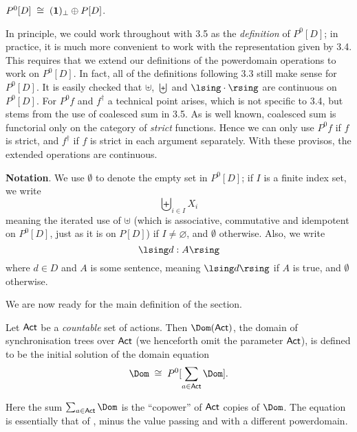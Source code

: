 \begin{observation}
$P^{0}[D] \; \cong \; ({\bf 1})_{\bot} \oplus P[D]$.
\end{observation}

In principle, we could work throughout with 3.5 as the {\em definition} of
$P^{0}[D]$; in practice, it is much more convenient to work with the
representation given by 3.4.
This requires that we extend our definitions of the powerdomain
operations to work on $P^{0}[D]$.
In fact, all of the definitions following 3.3 still make sense for $P^{0}[D]$.
It is easily checked that $\uplus$, $\biguplus$ and $\lsing \cdot \rsing$
are continuous on $P^{0}[D]$.
For $P^{0} f$ and $f^{\dagger}$ a technical point arises, which is not
specific to 3.4, but stems from the use of coalesced sum in 3.5.
As is well known,  coalesced sum is functorial only on the category of
{\em strict} functions.
Hence we can only use $P^{0} f$ if $f$ is strict, and $f^{\dagger}$ if $f$ is
strict in each argument separately.
With these provisos, the extended operations are continuous.

{\bf Notation}. We use $\emptyset$ to denote the empty set in $P^{0}[D]$;
if $I$ is a finite index set, we write
\[ \biguplus_{i \in I} X_{i} \]
meaning the iterated use of $\uplus$ (which is associative, commutative
and idempotent on $P^{0}[D]$, just as it is on $P[D]$) if $I \not=
\varnothing$, and $\emptyset$ otherwise.
Also, we write
\[ \lsing d : A \rsing \]
where $d \in D$ and $A$ is some sentence, meaning $\lsing d \rsing$ if
$A$ is true, and $\emptyset$ otherwise.

We are now ready for the main definition of the section.
\begin{definition}
{\rm Let ${\sf Act}$ be a {\em countable} set of actions.
Then $\Dom ({\sf Act})$, the domain of synchronisation trees over ${\sf Act}$ (we
henceforth omit the parameter ${\sf Act}$), is defined to be the initial solution
of the domain equation}
\begin{equation}
\Dom \; \cong \; P^{0}[ \sum_{a \in {\sf Act}} \Dom ]  . \label {domeq} 
\end{equation}
\end{definition}
Here the sum $\sum_{a \in {\sf Act}} \Dom$ is the ``copower'' of ${\sf Act}$ copies of 
 $\Dom$.
The equation is essentially that of \cite{MM79}, minus the value passing
and with a different powerdomain.

